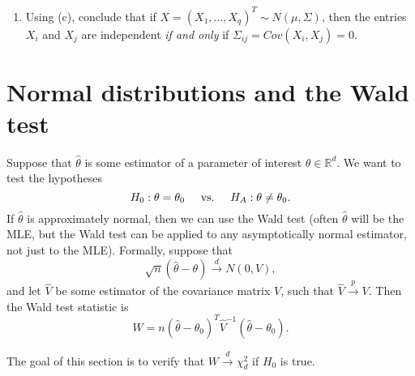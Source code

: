 \documentclass[11pt]{article}
\begin{document}
\begin{enumerate}
\begin{enumerate}
\item Using (c), conclude that if $X = (X_1,...,X_q)^T \sim N(\mu, \Sigma)$, then the entries $X_i$ and $X_j$ are independent \textit{if and only} if $\Sigma_{ij} = Cov(X_i, X_j) = 0$.

\end{enumerate}


\end{enumerate}



\section*{Normal distributions and the Wald test}

Suppose that $\widehat{\theta}$ is some estimator of a parameter of interest $\theta \in \mathbb{R}^d$. We want to test the hypotheses
$$H_0: \theta = \theta_0 \hspace{0.5cm} \text{vs.} \hspace{0.5cm} H_A: \theta \neq \theta_0.$$
If $\widehat{\theta}$ is approximately normal, then we can use the Wald test (often $\widehat{\theta}$ will be the MLE, but the Wald test can be applied to any asymptotically normal estimator, not just to the MLE). Formally, suppose that
$$\sqrt{n}(\widehat{\theta} - \theta) \overset{d}{\to} N(0, V),$$
and let $\widehat{V}$ be some estimator of the covariance matrix $V$, such that $\widehat{V} \overset{p}{\to} V$. Then the Wald test statistic is
$$W = n(\widehat{\theta} - \theta_0)^T \widehat{V}^{-1} (\widehat{\theta} - \theta_0).$$

\vspace{0.5cm}

\noindent The goal of this section is to verify that $W \overset{d}{\to} \chi^2_d$ if $H_0$ is true. 
\end{document}
